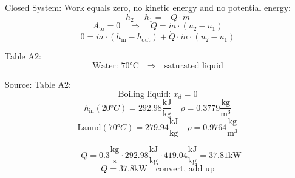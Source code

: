 Closed System: Work equals zero, no kinetic energy and no potential energy:
\[ h_2 - h_1 = -Q \cdot \dot{m} \]
\[ A_{\text{to}} = 0 \quad \Rightarrow \quad Q = \dot{m} \cdot (u_2 - u_1) \]
\[ 0 = \dot{m} \cdot (h_{\text{in}} - h_{\text{out}}) + \dot{Q} \cdot \dot{m} \cdot (u_2 - u_1) \]

Table A2:
\[ \text{Water: 70°C} \quad \Rightarrow \quad \text{saturated liquid} \]

Source: Table A2:
\[ \text{Boiling liquid: } x_d = 0 \]
\[ h_{\text{in}}(20°C) = 292.98 \frac{\text{kJ}}{\text{kg}} \quad \rho = 0.3779 \frac{\text{kg}}{\text{m}^3} \]
\[ \text{Laund}(70°C) = 279.94 \frac{\text{kJ}}{\text{kg}} \quad \rho = 0.9764 \frac{\text{kg}}{\text{m}^3} \]

\[ -Q = 0.3 \frac{\text{kg}}{\text{s}} \cdot 292.98 \frac{\text{kJ}}{\text{kg}} \cdot 419.04 \frac{\text{kJ}}{\text{kg}} = 37.81 \text{kW} \]
\[ Q = 37.8 \text{kW} \quad \text{convert, add up} \]